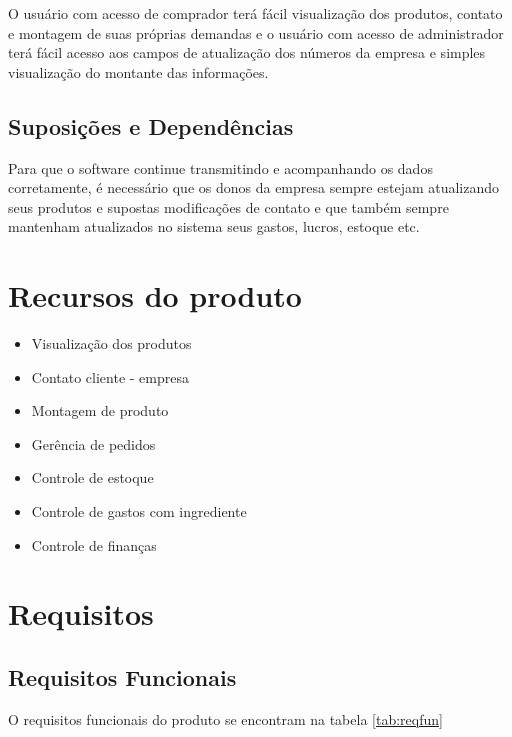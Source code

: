 O usuário com acesso de comprador terá fácil visualização dos produtos, contato e montagem de suas próprias demandas e o usuário com acesso de administrador terá fácil acesso aos campos de atualização dos números da empresa e simples visualização do montante das informações.

\subsection{Suposições e Dependências}

Para que o software continue transmitindo e acompanhando os dados corretamente, é necessário que os donos da empresa sempre estejam atualizando seus produtos e supostas modificações de contato e que também sempre mantenham atualizados no sistema seus gastos, lucros, estoque etc.

\section{Recursos do produto}

\begin{itemize}
	\item Visualização dos produtos
	\item Contato cliente - empresa
	\item Montagem de produto
	\item Gerência de pedidos
	\item Controle de estoque
	\item Controle de gastos com ingrediente
	\item Controle de finanças
\end{itemize}

\section{Requisitos}
\subsection{Requisitos Funcionais}

O requisitos funcionais do produto se encontram na tabela \ref{tab:reqfun}

